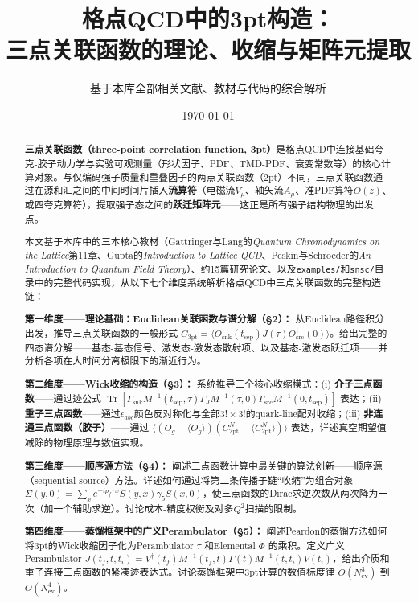 \documentclass[12pt,a4paper]{ctexart}
\title{\heiti 格点QCD中的3pt构造：\\
三点关联函数的理论、收缩与矩阵元提取}
\author{基于本库全部相关文献、教材与代码的综合解析}
\date{\today}
\theoremstyle{definition}
\begin{document}
\maketitle

\begin{abstract}
\noindent
\textbf{三点关联函数（three-point correlation function, 3pt）}是格点QCD中连接基础夸克-胶子动力学与实验可观测量（形状因子、PDF、TMD-PDF、衰变常数等）的核心计算对象。与仅编码强子质量和重叠因子的两点关联函数（2pt）不同，三点关联函数通过在源和汇之间的中间时间片插入\textbf{流算符}（电磁流$V_\mu$、轴矢流$A_\mu$、准PDF算符$O(z)$、或四夸克算符），提取强子态之间的\textbf{跃迁矩阵元}——这正是所有强子结构物理的出发点。

本文基于本库中的三本核心教材（Gattringer与Lang的\textit{Quantum Chromodynamics on the Lattice}第11章、Gupta的\textit{Introduction to Lattice QCD}、Peskin与Schroeder的\textit{An Introduction to Quantum Field Theory}）、约15篇研究论文、以及\texttt{examples/}和\texttt{snsc/}目录中的完整代码实现，从以下七个维度系统解析格点QCD中三点关联函数的完整构造链：

\textbf{第一维度——理论基础：Euclidean关联函数与谱分解（§2）：}
从Euclidean路径积分出发，推导三点关联函数的一般形式 $C_{3\text{pt}} = \langle O_{\text{snk}}(t_{\text{sep}}) J(\tau) O_{\text{src}}^\dagger(0) \rangle$。给出完整的四态谱分解——基态-基态信号、激发态-激发态散射项、以及基态-激发态跃迁项——并分析各项在大时间分离极限下的渐近行为。

\textbf{第二维度——Wick收缩的构造（§3）：}
系统推导三个核心收缩模式：(i) \textbf{介子三点函数}——通过迹公式 $\operatorname{Tr}[\Gamma_{\text{snk}} M^{-1}(t_{\text{sep}},\tau) \Gamma_J M^{-1}(\tau,0) \Gamma_{\text{src}} M^{-1}(0,t_{\text{sep}})]$ 表达；(ii) \textbf{重子三点函数}——通过$\epsilon_{abc}$颜色反对称化与全部$3! \times 3!$的quark-line配对收缩；(iii) \textbf{非连通三点函数（胶子）}——通过 $\langle (O_g - \langle O_g\rangle)(C_{2\text{pt}}^N - \langle C_{2\text{pt}}^N\rangle) \rangle$ 表达，详述真空期望值减除的物理原理与数值实现。

\textbf{第三维度——顺序源方法（§4）：}
阐述三点函数计算中最关键的算法创新——顺序源（sequential source）方法。详述如何通过将第二条传播子链``收缩''为组合对象 $\Sigma(y,0) = \sum_x e^{-ip_f \cdot x} S(y,x)\gamma_5 S(x,0)$，使三点函数的Dirac求逆次数从两次降为一次（加一个辅助求逆）。讨论成本-精度权衡及对多$Q^2$扫描的限制。

\textbf{第四维度——蒸馏框架中的广义Perambulator（§5）：}
阐述Peardon的蒸馏方法如何将3pt的Wick收缩因子化为Perambulator $\tau$ 和Elemental $\Phi$ 的乘积。定义广义Perambulator $J(t_f, t, t_i) = V^\dagger(t_f) M^{-1}(t_f,t) \Gamma(t) M^{-1}(t,t_i) V(t_i)$，给出介质和重子连接三点函数的紧凑迹表达式。讨论蒸馏框架中3pt计算的数值标度律 $O(N_{\text{ev}}^3)$ 到 $O(N_{\text{ev}}^4)$。


\end{abstract}
\end{document}
